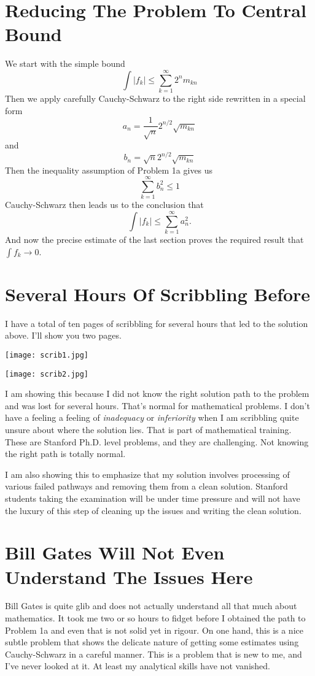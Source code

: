 \documentclass{amsart}
\begin{document}
\section{Reducing The Problem To Central Bound}

We start with the simple bound
\[
\int |f_k | \le \sum_{k=1}^\infty 2^n m_{kn}
\]
Then we apply carefully Cauchy-Schwarz to the right side rewritten in a special form
\[
a_n = \frac{1}{\sqrt{n}} 2^{n/2} \sqrt{m_{kn}}
\]
and
\[
b_n = \sqrt{n} 2^{n/2} \sqrt{m_{kn}}
\]
Then the inequality assumption of Problem 1a gives us
\[
\sum_{k=1}^\infty b_n^2 \le 1
\]
Cauchy-Schwarz then leads us to the conclusion that
\[
\int |f_k| \le \sum_{k=1}^\infty a_n^2.
\]
And now the precise estimate of the last section proves the required result that $\int f_k \rightarrow 0$.

\section{Several Hours Of Scribbling Before}

I have a total of ten pages of scribbling for several hours that led to the solution above.  I'll show you two pages.

\texttt{[image: scrib1.jpg]}

\texttt{[image: scrib2.jpg]}

I am showing this because I did not know the right solution path to the problem and was lost for several hours.  That's normal for mathematical problems.  I don't have a feeling a feeling of {\em inadequacy} or {\em inferiority} when I am scribbling quite unsure about where the solution lies.  That is part of mathematical training.  These are Stanford Ph.D. level problems, and they are challenging.  Not knowing the right path is totally normal.  

I am also showing this to emphasize that my solution involves processing of various failed pathways and removing them from a clean solution.  Stanford students taking the examination will be under time pressure and will not have the luxury of this step of cleaning up the issues and writing the clean solution.




\section{Bill Gates Will Not Even Understand The Issues Here}

Bill Gates is quite glib and does not actually understand all that much about mathematics.  It took me two or so hours to fidget before I obtained the path to Problem 1a and even that is not solid yet in rigour.  On one hand, this is a nice subtle problem that shows the delicate nature of getting some estimates using Cauchy-Schwarz in a careful manner.  This is a problem that is new to me, and I've never looked at it.  At least my analytical skills have not vanished.  
\end{document}
